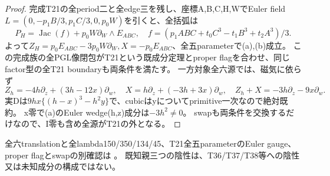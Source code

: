 \documentclass[a4paper,11pt]{ltjsarticle}
\theoremstyle{definition}
\begin{document}
\begin{proof}
完成T21の全period二と全edge三を残し、座標A,B,C,H,WでEuler field
$L=(0,-p_1B/3,p_1C/3,0,p_0W)$を引くと、全括弧は
\[
 P_H=\operatorname{Jac}(f)+p_0W\partial_W\wedge E_{ABC},\quad
 f=(p_1ABC+t_0C^3-t_1B^3+t_2A^3)/3.
\]
よって$Z_H=p_0E_{ABC}-3p_0W\partial_W,X=-p_0E_{ABC}$、全五parameterで(a),(b)成立。
この完成族の全PGL像閉包がT21という既成分定理とproper flagを合わせ、同じfactor型の全T21 boundaryも両条件を満たす。
一方対象全六源では、磁気に依らず
\[
 Z_h=-4h\partial_z+(3h-12x)\partial_w,\quad
 X=h\partial_z+(-3h+3x)\partial_w,\quad
 Z_h+X=-3h\partial_z-9x\partial_w.
\]
実Dは$9hx\{(h-x)^3-h^2y\}$で、cubicはyについてprimitive一次なので絶対既約。
x零で(a)のEuler wedge(h,z)成分は$-3h^2\ne0$。
swapも両条件を交換するだけなので、I零も含め全源がT21の外となる。
\end{proof}
全六translationと全lambda150/350/134/45、T21全五parameterのEuler gauge、proper flagとswapの別確認は
。
既知親三つの陰性は、T36/T37/T38等への陰性又は未知成分の構成ではない。
\end{document}
